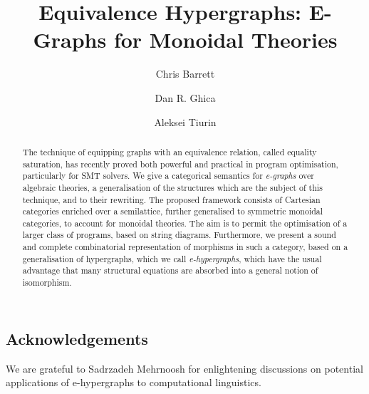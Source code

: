 \documentclass
  [ acmsmall
  , pdftex
  , dvipsnames
  , review
  , nonacm
  , screen
  ]{acmart}
\title{Equivalence Hypergraphs: E-Graphs for Monoidal Theories}
\author{Chris Barrett}
\author{Dan R. Ghica}
\author{Aleksei Tiurin}
\begin{document}
\begin{abstract}
The technique of equipping graphs with an equivalence relation, called equality saturation, has recently proved both powerful and practical in program optimisation, particularly for SMT solvers. 
We give a categorical semantics for \emph{e-graphs} over algebraic theories, a generalisation of the structures which are the subject of this technique, and to their rewriting. 
The proposed framework consists of Cartesian categories enriched over a semilattice,  further generalised to symmetric monoidal categories, to account for monoidal theories.
The aim is to permit the optimisation of a larger class of programs, based on string diagrams.  
Furthermore, we present a sound and complete combinatorial representation of morphisms in such a category, based on a generalisation of hypergraphs,  which we call \emph{e-hypergraphs}, which have the usual advantage that many structural equations are absorbed into a general notion of isomorphism. 
\end{abstract}

\maketitle








\subsection*{Acknowledgements}
We are grateful to Sadrzadeh Mehrnoosh for enlightening discussions on potential applications of e-hypergraphs to computational linguistics. 



\end{document}
